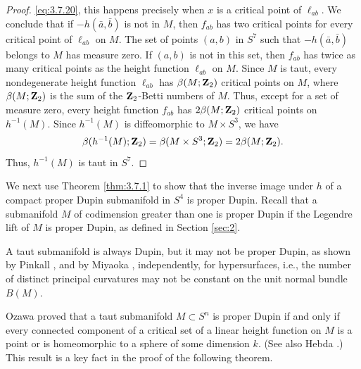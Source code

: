 \documentclass[12pt]{article}
\begin{document}
\begin{proof}
\eqref{eq:3.7.20}, this happens precisely when $x$ is a critical point of $\ell_{ab}$.  We conclude that if 
$- h(\bar{a}, \bar{b})$ is not in $M$, then $f_{ab}$ has two critical points for every critical point of 
$\ell_{ab}$ on $M$.  The set of points $(a,b)$ in $S^7$ such that $- h(\bar{a}, \bar{b})$ belongs to $M$ has measure
zero.  If $(a,b)$ is not in this set, then $f_{ab}$ has twice as many critical points as the height function
$\ell_{ab}$ on $M$.  Since $M$ is taut, every nondegenerate 
height function $\ell_{ab}$ has $\beta (M;{\bf Z}_2)$ critical
points on $M$, where $\beta (M;{\bf Z}_2)$ is the sum of the 
${\bf Z}_2$-Betti numbers of $M$.  
Thus, except for a set of measure zero, every height function $f_{ab}$
has $2 \beta (M;{\bf Z}_2)$ critical points on $h^{-1}(M)$.  Since $h^{-1}(M)$ is diffeomorphic to $M \times S^3$,
we have 
\begin{displaymath}
\beta (h^{-1}(M);{\bf Z}_2) = \beta (M \times S^3;{\bf Z}_2) = 2 \beta (M;{\bf Z}_2).
\end{displaymath}
Thus, $h^{-1}(M)$ is taut in $S^7$. 
\end{proof}

We next use Theorem \ref{thm:3.7.1} to show that the inverse image under $h$ of a compact 
proper Dupin submanifold in
$S^4$ is proper Dupin.  Recall that a submanifold $M$ of codimension greater than one is proper Dupin if the Legendre
lift of $M$ is proper Dupin, as defined in Section \ref{sec:2}.

A taut submanifold is always Dupin,
but it may not be proper Dupin, as shown by Pinkall \cite{P5}, and by
Miyaoka \cite{Mi2}, independently,
for hypersurfaces,
i.e., the number of distinct principal curvatures may not be constant on the 
unit normal bundle $B(M)$.  

Ozawa \cite{Oz} proved that a taut 
submanifold
$M \subset S^n$  is proper Dupin if and only if every
connected component of a critical set of a linear height function on $M$ is a point or is homeomorphic to a sphere
of some dimension $k$.  (See also Hebda \cite{Heb3}.)  
This result is a key fact in the proof of the following theorem. 
\end{document}
